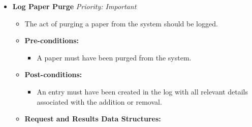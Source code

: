 \documentclass{article}
\begin{document}
\begin{itemize}
					\item \textbf{Log Paper Purge} \hfill \textit{Priority: Important}
					\begin{itemize}
						\item The act of purging a paper from the system should be logged.
						\item \textbf{Pre-conditions:}
						\begin{itemize}
							\item A paper must have been purged from the system.
						\end{itemize}
						\item \textbf{Post-conditions:}
						\begin{itemize}
							\item An entry must have been created in the log with all relevant details associated with the addition or removal.
						\end{itemize}
						\item \textbf{Request and Results Data Structures:}
					\end{itemize}
				\end{itemize}
			\cleardoublepage
\end{document}
